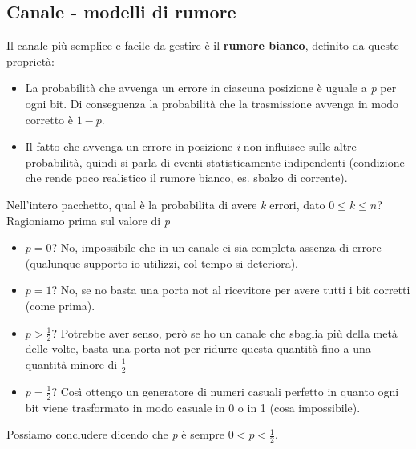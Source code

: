 \subsection*{Canale - modelli di rumore}

Il canale più semplice e facile da gestire è il \textbf{rumore bianco}, definito da queste proprietà:
\begin{itemize}
	\item La probabilità che avvenga un errore in ciascuna posizione è uguale a \textit{p} per ogni bit.
	Di conseguenza la probabilità che la trasmissione avvenga in modo corretto è $1-p$.
	\item Il fatto che avvenga un errore in posizione \textit{i} non influisce sulle altre probabilità, quindi si parla di eventi statisticamente indipendenti (condizione che rende poco realistico il rumore bianco, es. sbalzo di corrente).
\end{itemize}

Nell'intero pacchetto, qual è la probabilita di avere \textit{k} errori, dato $0 \leq k \leq n$?
Ragioniamo prima sul valore di \textit{p}
\begin{itemize}
	\item $p = 0$? No, impossibile che in un canale ci sia completa assenza di errore (qualunque supporto io utilizzi, col tempo si deteriora).
	\item $p = 1$? No, se no basta una porta not al ricevitore per avere tutti i bit corretti (come prima).
	\item $p > \frac{1}{2}$? Potrebbe aver senso, però se ho un canale che sbaglia più della metà delle volte, basta una porta not per ridurre questa quantità fino a una quantità minore di $\frac{1}{2}$ 
	\item $p = \frac{1}{2}$? Così ottengo un generatore di numeri casuali perfetto in quanto ogni bit viene trasformato in modo casuale in 0 o in 1 (cosa impossibile).
\end{itemize}

Possiamo concludere dicendo che \textit{p} è sempre $0 < p < \frac{1}{2}$.


